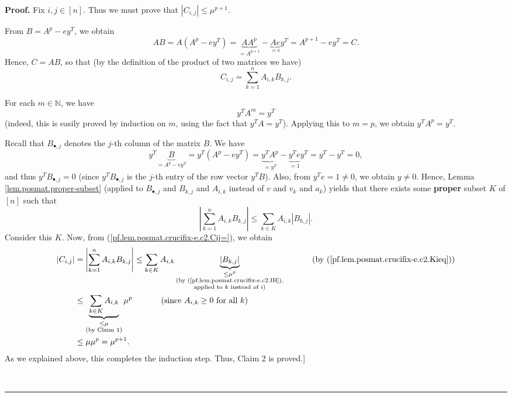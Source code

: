 \documentclass[numbers=enddot,12pt,final,onecolumn,notitlepage]{scrartcl}%
\numberwithin{exer}{subsection}
\theoremstyle{definition}
\newenvironment{proof}[1][Proof]{\noindent\textbf{#1.} }{\ \rule{0.5em}{0.5em}}
\let\sumnonlimits\sum
\renewcommand{\sum}{\sumnonlimits\limits}
\begin{document}
\begin{proof}
Fix $i,j\in\left[  n\right]  $. Thus we must prove that $\left\vert
C_{i,j}\right\vert \leq\mu^{p+1}$.

From $B=A^{p}-ey^{T}$, we obtain%
\[
AB=A\left(  A^{p}-ey^{T}\right)  =\underbrace{AA^{p}}_{=A^{p+1}}%
-\underbrace{Ae}_{=e}y^{T}=A^{p+1}-ey^{T}=C.
\]
Hence, $C=AB$, so that (by the definition of the product of two matrices we
have)%
\begin{equation}
C_{i,j}=\sum_{k=1}^{n}A_{i,k}B_{k,j}. \label{pf.lem.posmat.crucifix-e.c2.Cij=}%
\end{equation}


For each $m\in\mathbb{N}$, we have
\[
y^{T}A^{m}=y^{T}%
\]
(indeed, this is easily proved by induction on $m$, using the fact that
$y^{T}A=y^{T}$). Applying this to $m=p$, we obtain $y^{T}A^{p}=y^{T}$.

Recall that $B_{\bullet,j}$ denotes the $j$-th column of the matrix $B$. We
have%
\[
y^{T}\underbrace{B}_{=A^{p}-ey^{T}}=y^{T}\left(  A^{p}-ey^{T}\right)
=\underbrace{y^{T}A^{p}}_{=y^{T}}-\underbrace{y^{T}e}_{=1}y^{T}=y^{T}-y^{T}=0,
\]
and thus $y^{T}B_{\bullet,j}=0$ (since $y^{T}B_{\bullet,j}$ is the $j$-th
entry of the row vector $y^{T}B$). Also, from $y^{T}e=1\neq0$, we obtain
$y\neq0$. Hence, Lemma \ref{lem.posmat.proper-subset} (applied to
$B_{\bullet,j}$ and $B_{k,j}$ and $A_{i,k}$ instead of $v$ and $v_{k}$ and
$a_{k}$) yields that there exists some \textbf{proper} subset $K$ of $\left[
n\right]  $ such that%
\begin{equation}
\left\vert \sum_{k=1}^{n}A_{i,k}B_{k,j}\right\vert \leq\sum_{k\in K}%
A_{i,k}\left\vert B_{k,j}\right\vert .\label{pf.lem.posmat.crucifix-e.c2.Kieq}%
\end{equation}
Consider this $K$. Now, from (\ref{pf.lem.posmat.crucifix-e.c2.Cij=}), we
obtain%
\begin{align*}
\left\vert C_{i,j}\right\vert  &  =\left\vert \sum_{k=1}^{n}A_{i,k}%
B_{k,j}\right\vert \leq\sum_{k\in K}A_{i,k}\underbrace{\left\vert
B_{k,j}\right\vert }_{\substack{\leq\mu^{p}\\\text{(by
(\ref{pf.lem.posmat.crucifix-e.c2.IH}),}\\\text{applied to }k\text{ instead of
}i\text{)}}}\ \ \ \ \ \ \ \ \ \ \left(  \text{by
(\ref{pf.lem.posmat.crucifix-e.c2.Kieq})}\right)  \\
&  \leq\underbrace{\sum_{k\in K}A_{i,k}}_{\substack{\leq\mu\\\text{(by Claim
1)}}}\mu^{p}\ \ \ \ \ \ \ \ \ \ \left(  \text{since }A_{i,k}\geq0\text{ for
all }k\right)  \\
&  \leq\mu\mu^{p}=\mu^{p+1}.
\end{align*}
As we explained above, this completes the induction step. Thus, Claim 2 is
proved.] \medskip


\end{proof}
\end{document}
